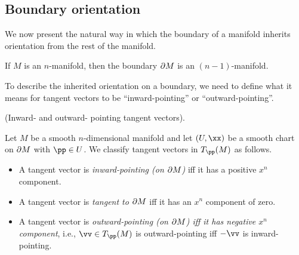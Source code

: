 \subsection*{Boundary orientation}

We now present the natural way in which the boundary of a manifold inherits orientation from the rest of the manifold.

\begin{lemma}
    If $M$ is an $n$-manifold, then the boundary $\partial M$ is an $(n - 1)$-manifold. %
\end{lemma}

To describe the inherited orientation on a boundary, we need to define what it means for tangent vectors to be ``inward-pointing'' or ``outward-pointing''.

\begin{defn}
     (Inward- and outward- pointing tangent vectors).
    
    Let $M$ be a smooth $n$-dimensional manifold and let $(U, \xx)$ be a smooth chart on $\partial M$ with $\pp \in U$. We classify tangent vectors in $T_\pp(M)$ as follows.
    
    \begin{itemize}
        \item A tangent vector is \textit{inward-pointing (on $\partial M$)} iff it has a positive $x^n$ component.
        \item A tangent vector is \textit{tangent to $\partial M$} iff it has an $x^n$ component of zero.
        \item A tangent vector is \textit{outward-pointing (on $\partial M$) iff it has negative $x^n$ component}, i.e., $\vv \in T_\pp(M)$ is outward-pointing iff $-\vv$ is inward-pointing.
    \end{itemize}
\end{defn}

    

